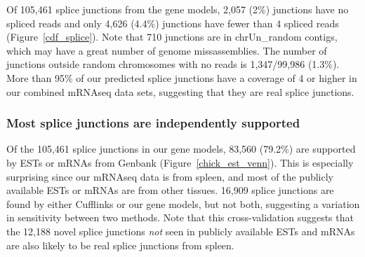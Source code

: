 \documentclass[10pt]{article}
\begin{document}
Of 105,461 splice junctions from the gene models, 2,057 (2\%) junctions have no
spliced reads and only 4,626 (4.4\%) junctions have fewer than 4 spliced reads
(Figure~\ref{cdf_splice}).  Note that 710 junctions are in chrUn\_random contigs,
which may have a great number of genome missassemblies. The number of junctions
outside random chromosomes with no reads is 1,347/99,986 (1.3\%).
More than 95\% of our predicted splice junctions have a coverage
of 4 or higher in our combined mRNAseq data sets, suggesting that they are
real splice junctions.

\subsubsection*{Most splice junctions are independently supported}

Of the 105,461 splice junctions in our gene models, 83,560 (79.2\%) are
supported by ESTs or mRNAs from Genbank (Figure~\ref{chick_est_venn}).  This is
especially surprising since our mRNAseq data is from spleen, and most of the
publicly available ESTs or mRNAs are from other tissues. 16,909 splice junctions
are found by either Cufflinks or our gene models, but not both, suggesting a variation in
sensitivity between two methods. Note that this cross-validation suggests that
the 12,188 novel splice junctions {\em not} seen in publicly available ESTs and
mRNAs are also likely to be real splice junctions from spleen.
\end{document}
